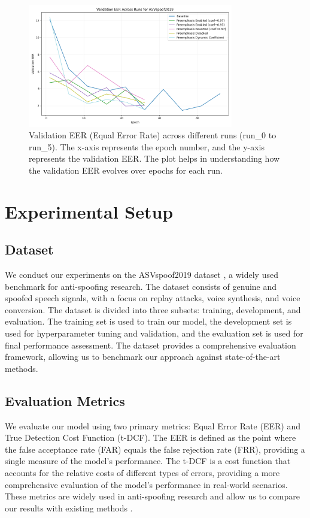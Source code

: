 \documentclass{article} %
\begin{document}
\begin{figure}[h]
    \centering
    \includegraphics[width=0.8\textwidth]{val_eer_ASVspoof2019_across_runs.png}
    \caption{Validation EER (Equal Error Rate) across different runs (run\_0 to run\_5). The x-axis represents the epoch number, and the y-axis represents the validation EER. The plot helps in understanding how the validation EER evolves over epochs for each run.}
    \label{fig:val_eer}
\end{figure}

\section{Experimental Setup}
\label{sec:experimental}
\subsection{Dataset}
\label{subsec:dataset}
We conduct our experiments on the ASVspoof2019 dataset \citep{asvspoof2019}, a widely used benchmark for anti-spoofing research. The dataset consists of genuine and spoofed speech signals, with a focus on replay attacks, voice synthesis, and voice conversion. The dataset is divided into three subsets: training, development, and evaluation. The training set is used to train our model, the development set is used for hyperparameter tuning and validation, and the evaluation set is used for final performance assessment. The dataset provides a comprehensive evaluation framework, allowing us to benchmark our approach against state-of-the-art methods.

\subsection{Evaluation Metrics}
\label{subsec:evaluation_metrics}
We evaluate our model using two primary metrics: Equal Error Rate (EER) and True Detection Cost Function (t-DCF). The EER is defined as the point where the false acceptance rate (FAR) equals the false rejection rate (FRR), providing a single measure of the model's performance. The t-DCF is a cost function that accounts for the relative costs of different types of errors, providing a more comprehensive evaluation of the model's performance in real-world scenarios. These metrics are widely used in anti-spoofing research and allow us to compare our results with existing methods \citep{asvspoof2019}.
\end{document}
